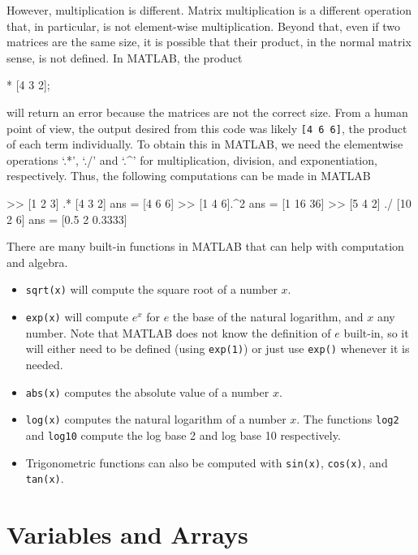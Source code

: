 However, multiplication is different. Matrix multiplication is a different operation that, in particular, is not element-wise multiplication. Beyond that, even if two matrices are the same size, it is possible that their product, in the normal matrix sense, is not defined. In MATLAB, the product
\begin{matlab}
[1 2 3] * [4 3 2];
\end{matlab}
will return an error because the matrices are not the correct size. From a human point of view, the output desired from this code was likely \texttt{[4 6 6]}, the product of each term individually. To obtain this in MATLAB, we need the elementwise operations `.*', `./' and `.\^{ }' for multiplication, division, and exponentiation, respectively. Thus, the following computations can be made in MATLAB
\begin{matlab}
>> [1 2 3] .* [4 3 2]
ans = 
   [4 6 6]
>> [1 4 6].^2
ans = 
    [1 16 36]
>> [5 4 2] ./ [10 2 6]
ans = 
    [0.5 2 0.3333]
\end{matlab}

There are many built-in functions in MATLAB that can help with computation and algebra. 
\begin{itemize}
    \item \texttt{sqrt(x)} will compute the square root of a number $x$.
    \item \texttt{exp(x)} will compute $e^x$ for $e$ the base of the natural logarithm, and $x$ any number. Note that MATLAB does not know the definition of $e$ built-in, so it will either need to be defined (using \texttt{exp(1)}) or just use \texttt{exp()} whenever it is needed. 
    \item \texttt{abs(x)} computes the absolute value of a number $x$.
    \item \texttt{log(x)} computes the natural logarithm of a number $x$. The functions \texttt{log2} and \texttt{log10} compute the log base 2 and log base 10 respectively.
    \item Trigonometric functions can also be computed with \texttt{sin(x)}, \texttt{cos(x)}, and \texttt{tan(x)}.
\end{itemize}

\section{Variables and Arrays}

